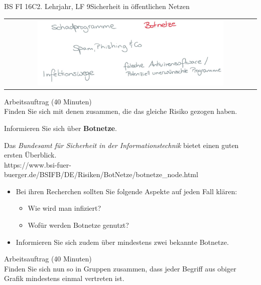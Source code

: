 \documentclass[oneside,openany,headings=optiontotoc,11pt,numbers=noenddot]{scrreprt}
\begin{document}
\begin{worksheet}{BS FI 16C}{2. Lehrjahr, LF 9}{Sicherheit in öffentlichen Netzen}
		\newpage
		\setcounter{page}{1}
		\begin{framed}
			\begin{tabular}{lcr}
				& \includegraphics[width=0.8\textwidth]{Bilder/Botnetze.jpg} & \\
			\end{tabular}
		\end{framed}
		\color{codegray}Arbeitsauftrag (40 Minuten)\\
		\color{black}
		Finden Sie sich mit denen zusammen, die das gleiche Risiko gezogen haben.
		\par
		\bigskip
		\noindent
		Informieren Sie sich über \textbf{Botnetze}.
		\par
		\bigskip
		\noindent
		Das \textit{Bundesamt für Sicherheit in der Informationstechnik} bietet einen guten ersten Überblick.\\
		\small{\color{codegray}https://www.bsi-fuer-buerger.de/BSIFB/DE/Risiken/BotNetze/botnetze\_node.html}
		\normalsize
		\begin{itemize}
			\item[] Bei ihren Recherchen sollten Sie folgende Aspekte auf jeden Fall klären:
			\begin{itemize}
				\item Wie wird man infiziert?
				\item Wofür werden Botnetze genutzt?
			\end{itemize}
			\item[] Informieren Sie sich zudem über mindestens zwei bekannte Botnetze.
		\end{itemize}
		\par
		\bigskip
		\noindent
		
		\color{codegray}Arbeitsauftrag (40 Minuten)\\
		\color{black}
		Finden Sie sich nun so in Gruppen zusammen, dass jeder Begriff aus obiger Grafik mindestens einmal vertreten ist.
	

\end{worksheet}
\end{document}
